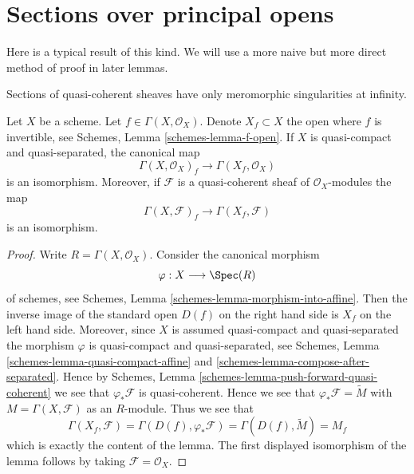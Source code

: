 \section{Sections over principal opens}
\label{section-principal-opens}

\noindent
Here is a typical result of this kind. We will use a more naive but
more direct method of proof in later lemmas.

\begin{lemma}
\label{lemma-invert-f-sections}
\begin{slogan}
Sections of quasi-coherent sheaves have only meromorphic singularities
at infinity.
\end{slogan}
Let $X$ be a scheme. Let $f \in \Gamma(X, \mathcal{O}_X)$.
Denote $X_f \subset X$ the open where $f$ is invertible, see
Schemes, Lemma \ref{schemes-lemma-f-open}.
If $X$ is quasi-compact and quasi-separated, the canonical map
$$
\Gamma(X, \mathcal{O}_X)_f \longrightarrow \Gamma(X_f, \mathcal{O}_X)
$$
is an isomorphism. Moreover, if $\mathcal{F}$ is a quasi-coherent
sheaf of $\mathcal{O}_X$-modules the map
$$
\Gamma(X, \mathcal{F})_f \longrightarrow \Gamma(X_f, \mathcal{F})
$$
is an isomorphism.
\end{lemma}

\begin{proof}
Write $R = \Gamma(X, \mathcal{O}_X)$. Consider the canonical morphism
$$
\varphi : X \longrightarrow \Spec(R)
$$
of schemes, see
Schemes, Lemma
\ref{schemes-lemma-morphism-into-affine}.
Then the inverse image of the standard open $D(f)$ on the
right hand side is $X_f$ on the left hand side.
Moreover, since $X$ is assumed quasi-compact and quasi-separated
the morphism $\varphi$ is quasi-compact and quasi-separated,
see Schemes, Lemma \ref{schemes-lemma-quasi-compact-affine} and
\ref{schemes-lemma-compose-after-separated}. Hence by
Schemes, Lemma \ref{schemes-lemma-push-forward-quasi-coherent}
we see that $\varphi_*\mathcal{F}$ is quasi-coherent.
Hence we see that $\varphi_*\mathcal{F} = \widetilde M$
with $M = \Gamma(X, \mathcal{F})$ as an $R$-module.
Thus we see that
$$
\Gamma(X_f, \mathcal{F}) =
\Gamma(D(f), \varphi_*\mathcal{F}) =
\Gamma(D(f), \widetilde M) = M_f
$$
which is exactly the content of the lemma. The first displayed isomorphism
of the lemma follows by taking $\mathcal{F} = \mathcal{O}_X$.
\end{proof}


